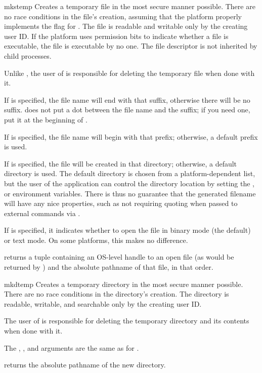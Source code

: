 \begin{funcdesc}{mkstemp}{}
Creates a temporary file in the most secure manner possible.  There
are no race conditions in the file's creation, assuming that the
platform properly implements the  flag for
.  The file is readable and writable only by the
creating user ID.  If the platform uses permission bits to indicate
whether a file is executable, the file is executable by no one.  The
file descriptor is not inherited by child processes.

Unlike , the user of  is
responsible for deleting the temporary file when done with it.

If  is specified, the file name will end with that suffix,
otherwise there will be no suffix.   does not put a
dot between the file name and the suffix; if you need one, put it at
the beginning of .

If  is specified, the file name will begin with that
prefix; otherwise, a default prefix is used.

If  is specified, the file will be created in that directory;
otherwise, a default directory is used.  The default directory is chosen
from a platform-dependent list, but the user of the application can control
the directory location by setting the ,  or 
environment variables.  There is thus no guarantee that the generated
filename will have any nice properties, such as not requiring quoting when
passed to external commands via .

If  is specified, it indicates whether to open the file in
binary mode (the default) or text mode.  On some platforms, this makes
no difference.

 returns a tuple containing an OS-level handle to
an open file (as would be returned by ) and the
absolute pathname of that file, in that order.
\end{funcdesc}

\begin{funcdesc}{mkdtemp}{}
Creates a temporary directory in the most secure manner possible.
There are no race conditions in the directory's creation.  The
directory is readable, writable, and searchable only by the
creating user ID.

The user of  is responsible for deleting the
temporary directory and its contents when done with it.

The , , and  arguments are the same
as for .

 returns the absolute pathname of the new directory.
\end{funcdesc}


